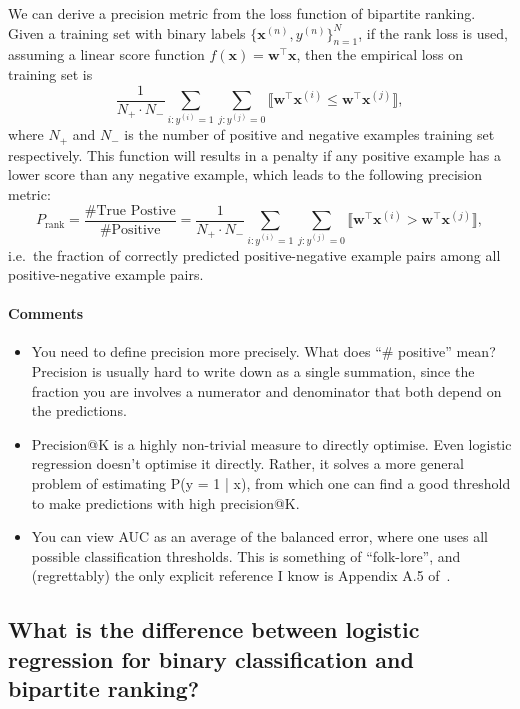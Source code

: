 \documentclass[9pt]{extarticle}
\newcommand{\llb}{\llbracket}
\newcommand{\rrb}{\rrbracket}
\newcommand{\x}{\mathbf{x}}
\newcommand{\1}{\mathbf{1}}
\newcommand{\w}{\mathbf{w}}
\newcommand{\pb}[1]{^{({#1})}}
\newcommand{\ie}{i.e.\ }
\begin{document}
We can derive a precision metric from the loss function of bipartite ranking.
Given a training set with binary labels $\{\x\pb{n}, y\pb{n}\}_{n=1}^N$, 
if the rank loss is used, assuming a linear score function $f(\x) = \w^\top \x$, 
then the empirical loss on training set is 
\begin{equation*}
\frac{1}{N_+ \cdot N_-} \sum_{i:y\pb{i}=1} \sum_{j:y\pb{j}=0} \llb \w^\top\x\pb{i} \le \w^\top\x\pb{j} \rrb,
\end{equation*}
where $N_+$ and $N_-$ is the number of positive and negative examples training set respectively.
This function will results in a penalty if any positive example has a lower score than any negative example,
which leads to the following precision metric:
\begin{equation}
\label{eq:precision_rank}
P_\text{rank} = \frac{\text{\#True Postive}}{\text{\#Positive}} 
              = \frac{1}{N_+ \cdot N_-} \sum_{i:y\pb{i}=1} \sum_{j:y\pb{j}=0} \llb \w^\top\x\pb{i} > \w^\top\x\pb{j} \rrb,
\end{equation}
\ie the fraction of correctly predicted positive-negative example pairs among all positive-negative example pairs.

\paragraph{Comments}
{\it
\begin{itemize}
\item You need to define precision more precisely. What does ``\# positive'' mean? Precision is usually hard to write down as a single summation, since the fraction you are involves a numerator and denominator that both depend on the predictions.
\item Precision@K is a highly non-trivial measure to directly optimise. Even logistic regression doesn't optimise it directly. Rather, it solves a more general problem of estimating P(y = 1 | x), from which one can find a good threshold to make predictions with high precision@K.
\item You can view AUC as an average of the balanced error, where one uses all possible classification thresholds. This is something of ``folk-lore'', and (regrettably) the only explicit reference I know is Appendix A.5 of~\cite{menon2015learning}.
\end{itemize}
}


\subsection*{What is the difference between logistic regression for binary classification and bipartite ranking?}
\end{document}
